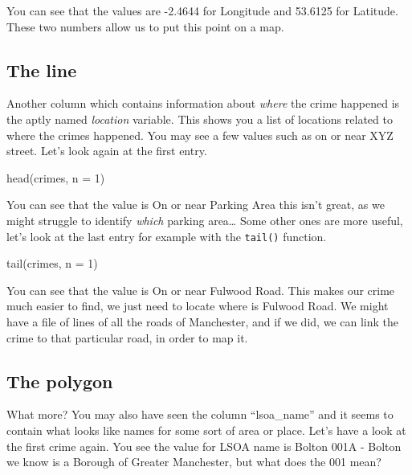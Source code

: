 \documentclass[
  krantz2]{krantz}
\makeatletter
\newenvironment{Shaded}{\begin{snugshade}}{\end{snugshade}}
\newcommand{\AttributeTok}[1]{\textcolor[rgb]{0.61,0.61,0.61}{#1}}
\newcommand{\DecValTok}[1]{\textcolor[rgb]{0.06,0.06,0.06}{#1}}
\newcommand{\FunctionTok}[1]{\textcolor[rgb]{0,0,0}{#1}}
\newcommand{\NormalTok}[1]{#1}
\newenvironment{kframe}{%
\medskip{}
\setlength{\fboxsep}{.8em}
 \def\at@end@of@kframe{}%
 \ifinner\ifhmode%
  \def\at@end@of@kframe{\end{minipage}}%
  \begin{minipage}{\columnwidth}%
 \fi\fi%
 \def\FrameCommand##1{\hskip\@totalleftmargin \hskip-\fboxsep
 \colorbox{shadecolor}{##1}\hskip-\fboxsep
     \hskip-\linewidth \hskip-\@totalleftmargin \hskip\columnwidth}%
 \MakeFramed {\advance\hsize-\width
   \@totalleftmargin\z@ \linewidth\hsize
   \@setminipage}}%
 {\par\unskip\endMakeFramed%
 \at@end@of@kframe}
\renewenvironment{Shaded}{\begin{kframe}}{\end{kframe}}
\makeatother
\begin{document}
You can see that the values are -2.4644 for Longitude and 53.6125 for Latitude. These two numbers allow us to put this point on a map.

\hypertarget{the-line}{%
\subsection{The line}\label{the-line}}

Another column which contains information about \emph{where} the crime happened is the aptly named \emph{location} variable. This shows you a list of locations related to where the crimes happened. You may see a few values such as on or near XYZ street. Let's look again at the first entry.

\begin{Shaded}
\begin{Highlighting}[]
\FunctionTok{head}\NormalTok{(crimes, }\AttributeTok{n =} \DecValTok{1}\NormalTok{)}
\end{Highlighting}
\end{Shaded}

You can see that the value is On or near Parking Area this isn't great, as we might struggle to identify \emph{which} parking area\ldots{} Some other ones are more useful, let's look at the last entry for example with the \texttt{tail()} function.

\begin{Shaded}
\begin{Highlighting}[]
\FunctionTok{tail}\NormalTok{(crimes, }\AttributeTok{n =} \DecValTok{1}\NormalTok{)}
\end{Highlighting}
\end{Shaded}

You can see that the value is On or near Fulwood Road. This makes our crime much easier to find, we just need to locate where is Fulwood Road. We might have a file of lines of all the roads of Manchester, and if we did, we can link the crime to that particular road, in order to map it.

\hypertarget{the-polygon}{%
\subsection{The polygon}\label{the-polygon}}

What more? You may also have seen the column ``lsoa\_name'' and it seems to contain what looks like names for some sort of area or place. Let's have a look at the first crime again. You see the value for LSOA name is Bolton 001A - Bolton we know is a Borough of Greater Manchester, but what does the 001 mean?
\end{document}
